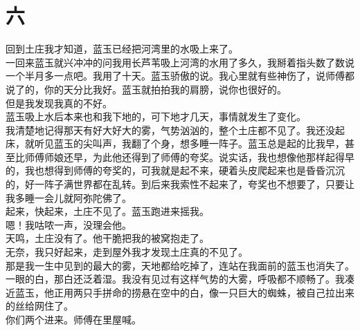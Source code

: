 \fancyhead[RO]{\thepage} %
\fancyhead[LE]{\thepage} %
\fancyfoot[LE,RO]{}
\fancyfoot[LO,CE]{}
\fancyfoot[CO,RE]{}
\chapter*{六}
回到土庄我才知道，蓝玉已经把河湾里的水吸上来了。\\

一回来蓝玉就兴冲冲的问我用长芦苇吸上河湾的水用了多久，我掰着指头数了数说一个半月多一点吧。我用了十天。蓝玉骄傲的说。我心里就有些神伤了，说师傅都说了的，你的天分比我好。蓝玉就拍拍我的肩膀，说你也很好的。
\\

但是我发现我真的不好。
\\

蓝玉吸上水后本来也和我下地的，可下地才几天，事情就发生了变化。
\\

我清楚地记得那天有好大好大的雾，气势汹汹的，整个土庄都不见了。我还没起床，就听见蓝玉的尖叫声，我翻了个身，想多睡一阵子。蓝玉总是起的比我早，甚至比师傅师娘还早，为此他还得到了师傅的夸奖。说实话，我也想像他那样起得早的，我也想得到师傅的夸奖的，可我就是起不来，硬着头皮爬起来也是昏昏沉沉的，好一阵子满世界都在乱转。到后来我索性不起来了，夸奖也不想要了，只要让我多睡一会儿就阿弥陀佛了。
\\

起来，快起来，土庄不见了。蓝玉跑进来摇我。
\\

嗯！我咕哝一声，没理会他。
\\

天鸣，土庄没有了。他干脆把我的被窝抱走了。
\\

无奈，我只好起来，走到屋外我才发现土庄真的不见了。
\\

那是我一生中见到的最大的雾，天地都给吃掉了，连站在我面前的蓝玉也消失了。一眼的白，那白还泛着湿。我没有见过有这样气势的大雾，呼吸都不顺畅了。我凑近蓝玉，他正用两只手拼命的捞悬在空中的白，像一只巨大的蜘蛛，被自己拉出来的丝给网住了。
\\

你们两个进来。师傅在里屋喊。
\\

